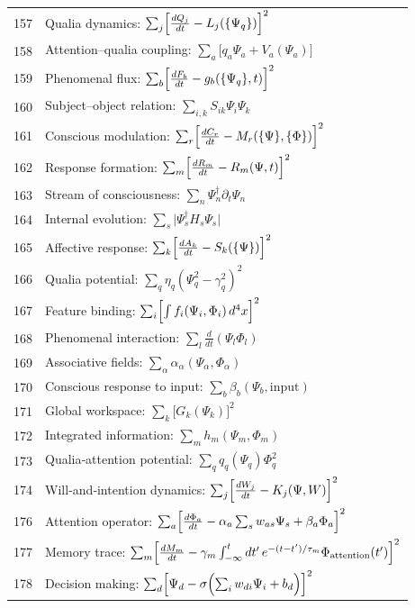 \documentclass[12pt,a4paper]{article}
\begin{document}
\begin{longtable}{r l}
		157 & Qualia dynamics: $\sum_j\Bigl[\frac{dQ_j}{dt} - L_j(\{\Psi_q\})\Bigr]^2$ \\
		158 & Attention–qualia coupling: $\sum_a\bigl[q_a\Psi_a + V_a(\Psi_a)\bigr]$ \\
		159 & Phenomenal flux: $\sum_b\Bigl[\frac{dF_b}{dt} - g_b(\{\Psi_q\},t)\Bigr]^2$ \\
		160 & Subject–object relation: $\sum_{i,k}S_{ik}\Psi_i\Psi_k$ \\
		161 & Conscious modulation: $\sum_r\Bigl[\frac{dC_r}{dt} - M_r(\{\Psi\},\{\Phi\})\Bigr]^2$ \\
		162 & Response formation: $\sum_m\Bigl[\frac{dR_m}{dt} - R_m(\Psi,t)\Bigr]^2$ \\
		163 & Stream of consciousness: $\sum_n\Psi^\dagger_n\partial_t\Psi_n$ \\
		164 & Internal evolution: $\sum_s\bigl|\Psi^\dagger_s H_s\Psi_s\bigr|$ \\
		165 & Affective response: $\sum_k\Bigl[\frac{dA_k}{dt} - S_k(\{\Psi\})\Bigr]^2$ \\
		166 & Qualia potential: $\sum_q\eta_q(\Psi_q^2 - \gamma_q^2)^2$ \\
		167 & Feature binding: $\sum_i\Bigl[\int f_i(\Psi_i,\Phi_i)\,d^4x\Bigr]^2$ \\
		168 & Phenomenal interaction: $\sum_l\frac{d}{dt}(\Psi_l\Phi_l)$ \\
		169 & Associative fields: $\sum_\alpha\alpha_\alpha(\Psi_\alpha,\Phi_\alpha)$ \\
		170 & Conscious response to input: $\sum_b\beta_b(\Psi_b,\text{input})$ \\
		171 & Global workspace: $\sum_k\bigl[G_k(\Psi_k)\bigr]^2$ \\
		172 & Integrated information: $\sum_m h_m(\Psi_m,\Phi_m)$ \\
		173 & Qualia‑attention potential: $\sum_q q_q(\Psi_q)\Phi_q^2$ \\
		174 & Will‑and‑intention dynamics: $\sum_j\Bigl[\frac{dW_j}{dt} - K_j(\Psi,W)\Bigr]^2$ \\
		176 & Attention operator: $\sum_a\Bigl[\frac{d\Phi_a}{dt} - \alpha_a\sum_s w_{as}\Psi_s + \beta_a\Phi_a\Bigr]^2$ \\
		177 & Memory trace: $\sum_m\Bigl[\frac{dM_m}{dt} - \gamma_m\int_{-\infty}^t dt'\,e^{-(t-t')/\tau_m}\Phi_{\text{attention}}(t')\Bigr]^2$ \\
		178 & Decision making: $\sum_d\Bigl[\Psi_d - \sigma\Bigl(\sum_i w_{di}\Psi_i + b_d\Bigr)\Bigr]^2$ \\

\end{longtable}
\end{document}
